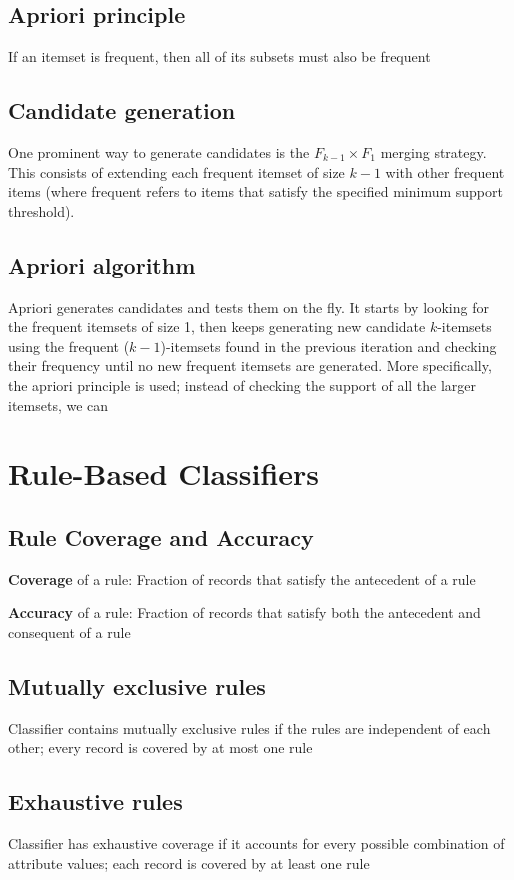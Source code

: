 \documentclass[12pt]{amsart}
\begin{document}
\subsection{Apriori principle}
If an itemset is frequent, then all of its subsets must also
be frequent

\subsection{Candidate generation} 
One prominent way to generate candidates is the $F_{k-1} \times F_1$ merging strategy. This consists of extending each frequent itemset of size $k-1$ with other frequent items (where frequent refers to items that satisfy the specified minimum support threshold).

\subsection{Apriori algorithm}
Apriori generates candidates and tests them on the fly. It starts by looking for the frequent itemsets of size 1, then keeps generating new candidate $k$-itemsets using the frequent ($k-1$)-itemsets found in the previous iteration and checking their frequency until no new frequent itemsets are generated. More specifically, the apriori principle is used; instead of checking the support of all the larger itemsets, we can 




\section{Rule-Based Classifiers}

\subsection{Rule Coverage and Accuracy}
\textbf{Coverage} of a rule:
Fraction of records
that satisfy the
antecedent of a rule

\textbf{Accuracy} of a rule:
Fraction of records
that satisfy both the
antecedent and
consequent of a
rule


\subsection{Mutually exclusive rules}
Classifier contains mutually exclusive rules if
the rules are independent of each other; every record is covered by at most one rule


\subsection{Exhaustive rules}
Classifier has exhaustive coverage if it
accounts for every possible combination of
attribute values; each record is covered by at least one rule
\end{document}

